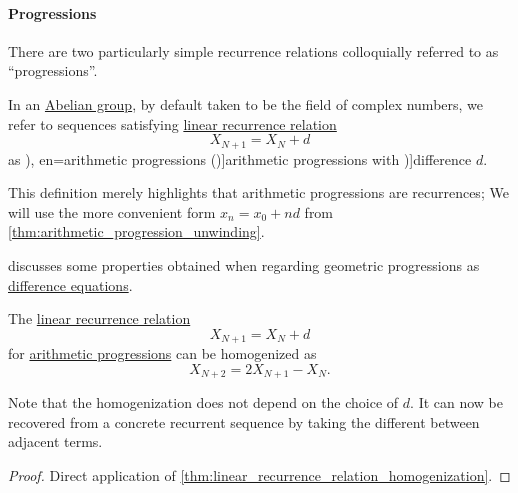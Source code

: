 \paragraph{Progressions}

There are two particularly simple recurrence relations colloquially referred to as \enquote{progressions}.

\begin{definition}\label{def:arithmetic_progression}\mimprovised
  In an \hyperref[def:abelian_group]{Abelian group}, by default taken to be the field of complex numbers, we refer to sequences satisfying \hyperref[def:linear_recurrence]{linear recurrence relation}
  \begin{equation}\label{eq:def:arithmetic_progression/recurrence}
    X_{N+1} = X_N + d
  \end{equation}
  as \term[ru=арифметические прогрессии (\cite[143]{Гончаров1952ФункцииДействительногоПеременного}), en=arithmetic progressions (\cite[def. 2.4.3]{Rosen2019DiscreteMathematics})]{arithmetic progressions} with \term[en=common difference (\cite[def. 2.4.3]{Rosen2019DiscreteMathematics})]{difference} \( d \).
\end{definition}
\begin{comments}
  \item This definition merely highlights that arithmetic progressions are recurrences; We will use the more convenient form \( x_n = x_0 + nd \) from \cref{thm:arithmetic_progression_unwinding}.

  \item {} discusses some properties obtained when regarding geometric progressions as \hyperref[def:difference_equation]{difference equations}.
\end{comments}

\begin{proposition}\label{thm:arithmetic_progression_homogeneization}
  The \hyperref[def:linear_recurrence]{linear recurrence relation}
  \begin{equation*}
    X_{N+1} = X_N + d
  \end{equation*}
  for \hyperref[def:arithmetic_progression]{arithmetic progressions} can be homogenized as
  \begin{equation}\label{eq:thm:arithmetic_progression_homogeneization}
    X_{N+2} = 2 X_{N+1} - X_N.
  \end{equation}
\end{proposition}
\begin{comments}
  \item Note that the homogenization does not depend on the choice of \( d \). It can now be recovered from a concrete recurrent sequence by taking the different between adjacent terms.
\end{comments}
\begin{proof}
  Direct application of \cref{thm:linear_recurrence_relation_homogenization}.
\end{proof}

